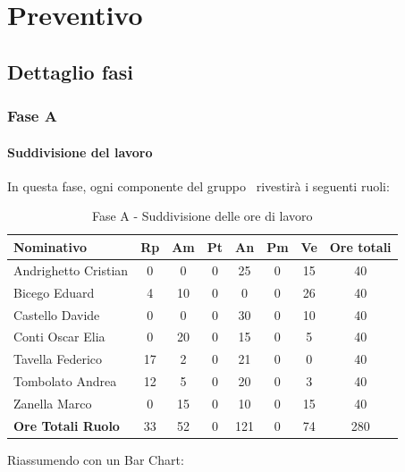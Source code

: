 \documentclass[../PianoProgetto.tex]{subfiles}
\begin{document}
	\section{Preventivo}
		\subsection{Dettaglio fasi}
			\subsubsection{Fase A}
				\paragraph{Suddivisione del lavoro}
					In questa fase, ogni componente del gruppo \leaf\ rivestirà i seguenti ruoli:
	
	\begin{table}[h]
		\begin{tabularx}{\textwidth}{l  * {6}{C}  c}
			\toprule
			\textbf{Nominativo} & \textbf{Rp} & \textbf{Am} & \textbf{Pt} 
						& \textbf{An} & \textbf{Pm} & \textbf{Ve} & \textbf{Ore totali} \\
			\midrule
			Andrighetto Cristian & 0 & 0 &	0 &	25 & 0 & 15 & 40 \\
			Bicego Eduard & 4 & 10 & 0 & 0 & 0 & 26 & 40 \\
			Castello Davide &	0 &	0 &	0 &	30 & 0 &	10 & 40 \\
			Conti Oscar Elia & 0 & 20 &	0 &	15 & 0 & 5 & 40 \\
			Tavella Federico &	17 & 2 & 0 & 21 & 0 & 0 & 40 \\
			Tombolato Andrea & 12 & 5 &	0 &	20 & 0 & 3 & 40 \\
			Zanella Marco & 0 & 15 & 0 & 10 & 0 & 15 & 40 \\
			\midrule			
			\textbf{Ore Totali Ruolo} & 33 & 52 & 0 & 121 &	0 &	74 & 280 \\
			\bottomrule
		\end{tabularx}
		\caption{Fase A - Suddivisione delle ore di lavoro}
		\label{tab:faseA_ore}
	\end{table}

\vfill
Riassumendo con un Bar Chart:	
	
\end{document}
